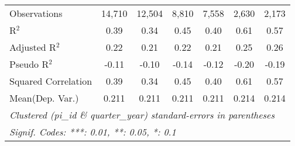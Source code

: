 \begin{tabular}{lcccccc}
   Observations                                               & 14,710      & 12,504      & 8,810   & 7,558   & 2,630       & 2,173\\  
   R$^2$                                                      & 0.39        & 0.34        & 0.45    & 0.40    & 0.61        & 0.57\\  
   Adjusted R$^2$                                             & 0.22        & 0.21        & 0.22    & 0.21    & 0.25        & 0.26\\  
   Pseudo R$^2$                                               & -0.11       & -0.10       & -0.14   & -0.12   & -0.20       & -0.19\\  
   Squared Correlation                                        & 0.39        & 0.34        & 0.45    & 0.40    & 0.61        & 0.57\\  
Mean(Dep. Var.) & 0.211 & 0.211 & 0.211 & 0.211 & 0.214 & 0.214 \\
   \midrule \midrule
   \multicolumn{7}{l}{\emph{Clustered (pi\_id \& quarter\_year) standard-errors in parentheses}}\\
   \multicolumn{7}{l}{\emph{Signif. Codes: ***: 0.01, **: 0.05, *: 0.1}}\\
\end{tabular}
\par\endgroup
